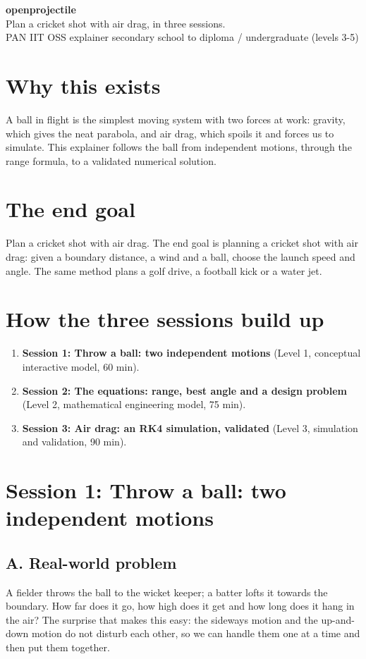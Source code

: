 \documentclass[11pt,a4paper]{article}
\begin{document}
\begin{center}{\LARGE\bfseries openprojectile}\\[0.4em]{\large Plan a cricket shot with air drag, in three sessions.}\\[0.2em]\small PAN IIT OSS explainer \textbullet{} secondary school to diploma / undergraduate (levels 3-5)\end{center}

\section*{Why this exists}
A ball in flight is the simplest moving system with two forces at work: gravity, which gives the neat parabola, and air drag, which spoils it and forces us to simulate. This explainer follows the ball from independent motions, through the range formula, to a validated numerical solution.

\section*{The end goal}
Plan a cricket shot with air drag. The end goal is planning a cricket shot with air drag: given a boundary distance, a wind and a ball, choose the launch speed and angle. The same method plans a golf drive, a football kick or a water jet.

\section*{How the three sessions build up}
\begin{enumerate}[nosep]
\item \textbf{Session 1: Throw a ball: two independent motions} (Level 1, conceptual interactive model, 60 min).
\item \textbf{Session 2: The equations: range, best angle and a design problem} (Level 2, mathematical engineering model, 75 min).
\item \textbf{Session 3: Air drag: an RK4 simulation, validated} (Level 3, simulation and validation, 90 min).
\end{enumerate}

\section{Session 1: Throw a ball: two independent motions}

\subsection*{A. Real-world problem}
A fielder throws the ball to the wicket keeper; a batter lofts it towards the boundary. How far does it go, how high does it get and how long does it hang in the air? The surprise that makes this easy: the sideways motion and the up-and-down motion do not disturb each other, so we can handle them one at a time and then put them together.
\end{document}
